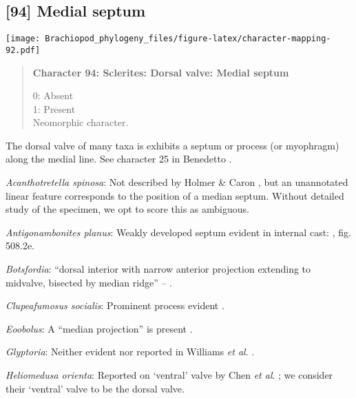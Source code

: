 \documentclass[openany]{book}
\theoremstyle{definition}
\theoremstyle{definition}
\theoremstyle{definition}
\theoremstyle{remark}
\begin{document}
\subsection*{{[}94{]} Medial septum}\label{medial-septum}

\texttt{[image: Brachiopod\_phylogeny\_files/figure-latex/character-mapping-92.pdf]}

\begin{quote}
\textbf{Character 94: Sclerites: Dorsal valve: Medial septum}

0: Absent\\
1: Present\\
Neomorphic character.
\end{quote}

The dorsal valve of many taxa is exhibits a septum or process (or
myophragm) along the medial line. See character 25 in Benedetto
\citeyearpar{Benedetto2009iChaniella}.

\hypertarget{Acanthotretella_spinosa-coding-94}{}
\emph{Acanthotretella spinosa}: Not described by Holmer \& Caron
\citeyearpar{Holmer2006Aspinose}, but an unannotated linear feature
corresponds to the position of a median septum. Without detailed study
of the specimen, we opt to score this as ambiguous.

\hypertarget{Antigonambonites_planus-coding-94}{}
\emph{Antigonambonites planus}: Weakly developed septum evident in
internal cast: \citet{Williams2000LinguliformeaCraniiformea}, fig.
508.2e.

\hypertarget{Botsfordia-coding-94}{}
\emph{Botsfordia}: ``dorsal interior with narrow anterior projection
extending to midvalve, bisected by median ridge'' --
\citet{Williams2000LinguliformeaCraniiformea}.

\hypertarget{Clupeafumosus_socialis-coding-94}{}
\emph{Clupeafumosus socialis}: Prominent process evident
\citep{Topper2013Reappraisalof}.

\hypertarget{Eoobolus-coding-94}{}
\emph{Eoobolus}: A ``median projection'' is present \citep[fig. 4g
in][]{Balthasar2009Thebrachiopod}.

\hypertarget{Glyptoria-coding-94}{}
\emph{Glyptoria}: Neither evident nor reported in Williams \emph{et al}.
\citeyearpar{Williams2000LinguliformeaCraniiformea}.

\hypertarget{Heliomedusa_orienta-coding-94}{}
\emph{Heliomedusa orienta}: Reported on `ventral' valve by Chen \emph{et
al}. \citeyearpar{Chen2007Reinterpretationof}; we consider their
`ventral' valve to be the dorsal valve.
\end{document}
